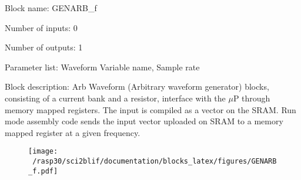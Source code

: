 \pagebreak

Block name: GENARB\_f

Number of inputs: 0

Number of outputs: 1

Parameter list: Waveform Variable name, Sample rate

Block description: 
Arb Waveform (Arbitrary waveform generator) blocks, consisting of a current bank and a resistor, interface with the $\mu$P through memory mapped registers. The input is compiled as a vector on the SRAM. Run mode assembly code sends the input vector uploaded on SRAM to a memory mapped register at a given frequency.

\begin{figure}[H]  %
\texttt{[image: ~/rasp30/sci2blif/documentation/blocks\_latex/figures/GENARB\_f.pdf]}
\end{figure}

